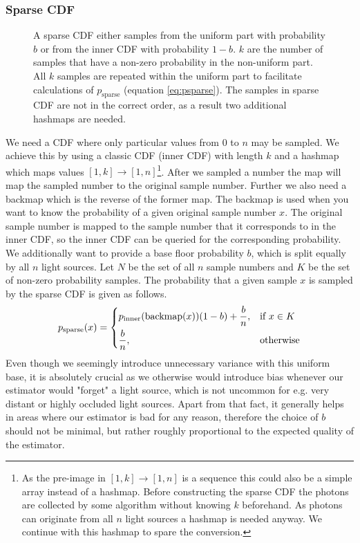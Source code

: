 \subsubsection{Sparse CDF}
\label{sec:sparse}
\begin{figure}[htb] 
	\centering
    
    \caption{A sparse CDF either samples from the uniform part with probability $b$ or from the inner CDF with probability $1-b$. $k$ are the number of samples that have a non-zero probability in the non-uniform part. All $k$ samples are repeated within the uniform part to facilitate calculations of $p_{\text{sparse}}$ (equation \ref{eq:psparse}). The samples in sparse CDF are not in the correct order, as a result two additional hashmaps are needed.} 
    \label{fig:sparseCDF}
\end{figure}

We need  a CDF where only particular values from $0$ to $n$ may be sampled. We achieve this by using a classic CDF (inner CDF) with length $k$ and a hashmap which maps values $[1,k]\to [1,n]$\footnote{As the pre-image in $[1,k]\to [1,n]$ is a sequence this could also be a simple array instead of a hashmap. Before constructing the sparse CDF the photons are collected by some algorithm without knowing $k$ beforehand. As photons can originate from all $n$ light sources a hashmap is needed anyway. We continue with this hashmap to spare the conversion.}. After we sampled a number the map will map the sampled number to the original sample number. Further we also need a backmap which is the reverse of the former map. The backmap is used when you want to know the probability of a given original sample number $x$. The original sample number is mapped to the sample number that it corresponds to in the inner CDF, so the inner CDF can be queried for the corresponding probability. We additionally want to provide a base floor probability $b$, which is split equally by all $n$ light sources. Let $N$ be the set of all $n$ sample numbers and $K$ be the set of non-zero probability samples. The probability that a given sample $x$ is sampled by the sparse CDF is given as follows.
\begin{equation}\label{eq:psparse}
 p_{\text{sparse}}(x) = 
\begin{dcases}
    p_{\text{inner}}(\text{backmap}(x))(1 - b) + \frac{b}{n},& \text{if } x \in K\\
    \frac{b}{n}, & \text{otherwise}
\end{dcases}
\end{equation}
Even though we seemingly introduce unnecessary variance with this uniform base, it is absolutely crucial as we otherwise would introduce bias whenever our estimator would "forget" a light source, which is not uncommon for e.g. very distant or highly occluded light sources. Apart from that fact, it generally helps in areas where our estimator is bad for any reason, therefore the choice of $b$ should not be minimal, but rather roughly proportional to the expected quality of the estimator.

